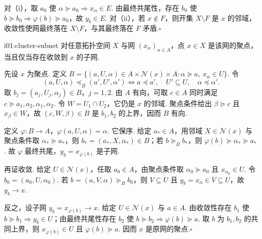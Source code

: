 \begin{FAProof}
对（i），取 \(\displaystyle a_0\) 使 \(\displaystyle \alpha\succeq a_0\Rightarrow x_\alpha\in E\). 由最终共尾性，存在 \(\displaystyle b_0\) 使 \(\displaystyle b\succeq b_0\Rightarrow\varphi(b)\succeq a_0\)，故 \(\displaystyle y_b\in E\). 对（ii），若 \(\displaystyle x\notin F\)，则开集 \(\displaystyle X\setminus F\) 是 \(\displaystyle x\) 的邻域，收敛性使网最终落在 \(\displaystyle X\setminus F\)，与其最终落在 \(\displaystyle F\) 矛盾.\hfill\(\square\)
\end{FAProof}

\begin{FALemma}[B][聚点与收敛子网]{i01:cluster-subnet}
对任意拓扑空间 \(\displaystyle X\) 与网 \(\displaystyle (x_\alpha)_{\alpha\in A}\)，点 \(\displaystyle x\in X\) 是该网的聚点，当且仅当存在收敛到 \(\displaystyle x\) 的子网.
\end{FALemma}

\begin{FAProof}
先设 \(\displaystyle x\) 为聚点. 定义 \(\displaystyle B=\{(a,U,\alpha)\in A\times\mathcal N(x)\times A:\alpha\succeq a,\ x_\alpha\in U\}\).
令
\[
(a,U,\alpha)\preceq_B(a',U',\alpha')
\iff
a\preceq a',\quad U'\subseteq U,\quad \alpha\preceq\alpha'.
\]
取 \(\displaystyle b_j=(a_j,U_j,\alpha_j)\in B\)，\(\displaystyle j=1,2\). 由 \(\displaystyle A\) 有向，可取 \(\displaystyle c\in A\) 同时满足 \(\displaystyle c\succeq a_1,a_2,\alpha_1,\alpha_2\). 令 \(\displaystyle W=U_1\cap U_2\)，它仍是 \(\displaystyle x\) 的邻域. 聚点条件给出 \(\displaystyle \beta\succeq c\) 且 \(\displaystyle x_\beta\in W\)，故 \(\displaystyle (c,W,\beta)\in B\) 是 \(\displaystyle b_1,b_2\) 的上界，因而 \(\displaystyle B\) 有向.

定义 \(\displaystyle \varphi:B\to A\)，\(\displaystyle \varphi(a,U,\alpha)=\alpha\). 它保序. 给定 \(\displaystyle a_*\in A\)，用邻域 \(\displaystyle X\in\mathcal N(x)\) 与聚点条件取 \(\displaystyle \alpha_*\succeq a_*\)，则 \(\displaystyle b_*=(a_*,X,\alpha_*)\in B\)；若 \(\displaystyle b\succeq_B b_*\)，则 \(\displaystyle \varphi(b)\succeq\alpha_*\succeq a_*\). 故 \(\displaystyle \varphi\) 最终共尾，\(\displaystyle y_b=x_{\varphi(b)}\) 是子网.

再证收敛. 给定 \(\displaystyle U\in\mathcal N(x)\)，任取 \(\displaystyle a_0\in A\)，由聚点条件取 \(\displaystyle \alpha_0\succeq a_0\) 且 \(\displaystyle x_{\alpha_0}\in U\). 令 \(\displaystyle b_0=(a_0,U,\alpha_0)\). 若 \(\displaystyle b=(a,V,\alpha)\succeq_B b_0\)，则 \(\displaystyle V\subseteq U\) 且 \(\displaystyle y_b=x_\alpha\in V\subseteq U\)，故 \(\displaystyle y_b\to x\).

反之，设子网 \(\displaystyle y_b=x_{\varphi(b)}\to x\). 给定 \(\displaystyle U\in\mathcal N(x)\) 与 \(\displaystyle a\in A\). 由收敛性存在 \(\displaystyle b_1\) 使 \(\displaystyle b\succeq b_1\Rightarrow y_b\in U\)；由最终共尾性存在 \(\displaystyle b_2\) 使 \(\displaystyle b\succeq b_2\Rightarrow\varphi(b)\succeq a\). 取 \(\displaystyle b\) 为 \(\displaystyle b_1,b_2\) 的共同上界，则 \(\displaystyle x_{\varphi(b)}\in U\) 且 \(\displaystyle \varphi(b)\succeq a\). 因而 \(\displaystyle x\) 是原网的聚点.\hfill\(\square\)
\end{FAProof}

